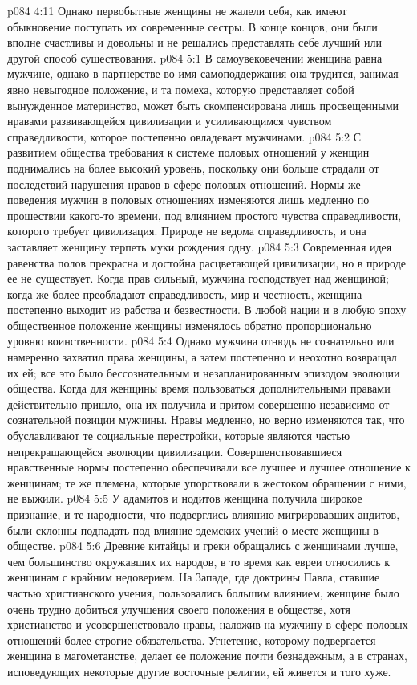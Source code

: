 \vs p084 4:11 Однако первобытные женщины не жалели себя, как имеют обыкновение поступать их современные сестры. В конце концов, они были вполне счастливы и довольны и не решались представлять себе лучший или другой способ существования.
\vs p084 5:1 В самоувековечении женщина равна мужчине, однако в партнерстве во имя самоподдержания она трудится, занимая явно невыгодное положение, и та помеха, которую представляет собой вынужденное материнство, может быть скомпенсирована лишь просвещенными нравами развивающейся цивилизации и усиливающимся чувством справедливости, которое постепенно овладевает мужчинами.
\vs p084 5:2 С развитием общества требования к системе половых отношений у женщин поднимались на более высокий уровень, поскольку они больше страдали от последствий нарушения нравов в сфере половых отношений. Нормы же поведения мужчин в половых отношениях изменяются лишь медленно по прошествии какого\hyp{}то времени, под влиянием простого чувства справедливости, которого требует цивилизация. Природе не ведома справедливость, и она заставляет женщину терпеть муки рождения одну.
\vs p084 5:3 Современная идея равенства полов прекрасна и достойна расцветающей цивилизации, но в природе ее не существует. Когда прав сильный, мужчина господствует над женщиной; когда же более преобладают справедливость, мир и честность, женщина постепенно выходит из рабства и безвестности. В любой нации и в любую эпоху общественное положение женщины изменялось обратно пропорционально уровню воинственности.
\vs p084 5:4 Однако мужчина отнюдь не сознательно или намеренно захватил права женщины, а затем постепенно и неохотно возвращал их ей; все это было бессознательным и незапланированным эпизодом эволюции общества. Когда для женщины время пользоваться дополнительными правами действительно пришло, она их получила и притом совершенно независимо от сознательной позиции мужчины. Нравы медленно, но верно изменяются так, что обуславливают те социальные перестройки, которые являются частью непрекращающейся эволюции цивилизации. Совершенствовавшиеся нравственные нормы постепенно обеспечивали все лучшее и лучшее отношение к женщинам; те же племена, которые упорствовали в жестоком обращении с ними, не выжили.
\vs p084 5:5 \pc У адамитов и нодитов женщина получила широкое признание, и те народности, что подверглись влиянию мигрировавших андитов, были склонны подпадать под влияние эдемских учений о месте женщины в обществе.
\vs p084 5:6 Древние китайцы и греки обращались с женщинами лучше, чем большинство окружавших их народов, в то время как евреи относились к женщинам с крайним недоверием. На Западе, где доктрины Павла, ставшие частью христианского учения, пользовались большим влиянием, женщине было очень трудно добиться улучшения своего положения в обществе, хотя христианство и усовершенствовало нравы, наложив на мужчину в сфере половых отношений более строгие обязательства. Угнетение, которому подвергается женщина в магометанстве, делает ее положение почти безнадежным, а в странах, исповедующих некоторые другие восточные религии, ей живется и того хуже.
